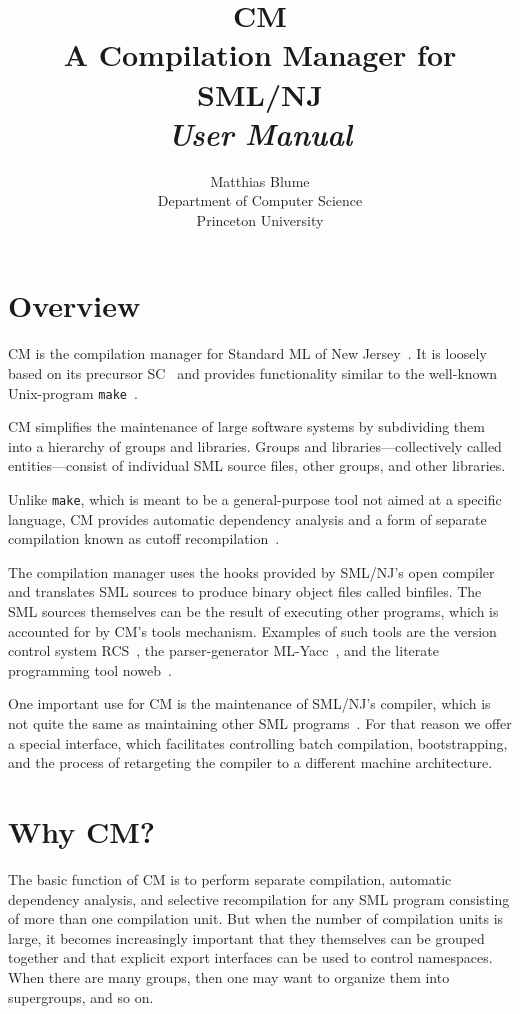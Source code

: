 \documentclass{article}
\author{Matthias Blume\\
Department of Computer Science\\
Princeton University}
\title{{\bf CM}\\
A Compilation Manager for SML/NJ\\
{\em User Manual}}
\begin{document}


\maketitle

\section{Overview}

CM is the compilation manager for Standard ML of New
Jersey~\cite{milner89,appel91:sml}.  It is loosely based on its
precursor SC~\cite{harper94:irm,harper-lee-pfenning-rollins-CM} and
provides functionality similar to the well-known {\sc Unix}-program
{\tt make}~\cite{feldman79}.

CM simplifies the maintenance of large software systems by subdividing
them into a hierarchy of groups and libraries.  Groups and
libraries---collectively called entities---consist of individual SML
source files, other groups, and other libraries.

Unlike {\tt make}, which is meant to be a general-purpose tool not
aimed at a specific language, CM provides automatic dependency
analysis and a form of separate compilation known as cutoff
recompilation~\cite{tichy94}.

The compilation manager uses the hooks provided by SML/NJ's open
compiler~\cite{appel94:sepcomp} and translates SML sources to produce
binary object files called binfiles.  The SML sources themselves can
be the result of executing other programs, which is accounted for by
CM's tools mechanism.  Examples of such tools are the version control
system RCS~\cite{tichy85:rcs}, the parser-generator
ML-Yacc~\cite{tarditi90:yacc}, and the literate programming tool
noweb~\cite{ramsey:simplified}.

One important use for CM is the maintenance of SML/NJ's compiler,
which is not quite the same as maintaining other SML
programs~\cite{appel94:bootstrap}.  For that reason we offer a special
interface, which facilitates controlling batch compilation,
bootstrapping, and the process of retargeting the compiler to a
different machine architecture.

\section{Why CM?}

The basic function of CM is to perform separate compilation, automatic
dependency analysis, and selective recompilation for any SML program
consisting of more than one compilation unit.  But when the number of
compilation units is large, it becomes increasingly important
that they themselves can be grouped together and that explicit export
interfaces can be used to control namespaces. When there are many
groups, then one may want to organize them into supergroups, and so
on.
\end{document}
